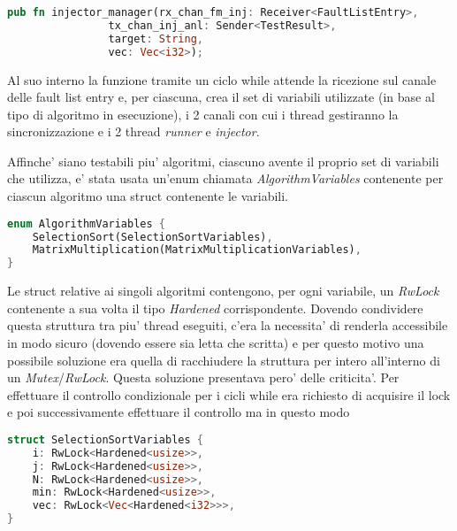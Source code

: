 \begin{lstlisting}[language=Rust, style=boxed]
pub fn injector_manager(rx_chan_fm_inj: Receiver<FaultListEntry>,
                tx_chan_inj_anl: Sender<TestResult>,
                target: String,
                vec: Vec<i32>);
\end{lstlisting}

Al suo interno la funzione tramite un ciclo while attende la ricezione sul canale delle fault list entry e, per ciascuna, crea il set di variabili utilizzate (in base al tipo di algoritmo in esecuzione), i 2 canali con cui i thread gestiranno la sincronizzazione e i 2 thread \textit{runner} e \textit{injector}.

Affinche' siano testabili piu' algoritmi, ciascuno avente il proprio set di variabili che utilizza, e' stata usata un'enum chiamata \textit{AlgorithmVariables} contenente per ciascun algoritmo una struct contenente le variabili. 

\begin{lstlisting}[language=Rust, style=boxed]
enum AlgorithmVariables {
    SelectionSort(SelectionSortVariables),
    MatrixMultiplication(MatrixMultiplicationVariables),
}
\end{lstlisting}

Le struct relative ai singoli algoritmi contengono, per ogni variabile, un \textit{RwLock} contenente a sua volta il tipo \textit{Hardened} corrispondente. Dovendo condividere questa struttura tra piu' thread eseguiti, c'era la necessita' di renderla accessibile in modo sicuro (dovendo essere sia letta che scritta) e per questo motivo una possibile soluzione era quella di racchiudere la struttura per intero all'interno di un \textit{Mutex}/\textit{RwLock}. Questa soluzione presentava pero' delle criticita'. Per effettuare il controllo condizionale per i cicli while era richiesto di acquisire il lock e poi successivamente effettuare il controllo ma in questo modo 


\begin{lstlisting}[language=Rust, style=boxed]
struct SelectionSortVariables {
    i: RwLock<Hardened<usize>>,
    j: RwLock<Hardened<usize>>,
    N: RwLock<Hardened<usize>>,
    min: RwLock<Hardened<usize>>,
    vec: RwLock<Vec<Hardened<i32>>>,
}
\end{lstlisting}

